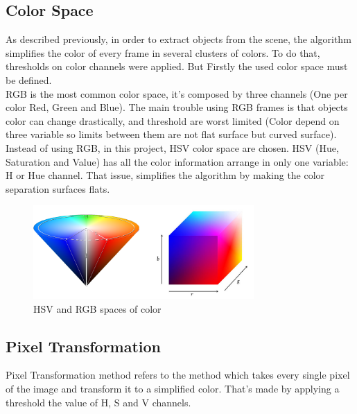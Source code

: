 \subsection{Color Space}
As described previously, in order to extract objects from the scene, the algorithm simplifies the color of every frame in several clusters of colors. To do that, thresholds on color channels were applied. But Firstly the used color space must be defined. \\
RGB is the most common color space, it's composed by three channels (One per color Red, Green and Blue). The main trouble using RGB frames is that objects color can change drastically, and threshold are worst limited (Color depend on three variable so limits between them are not flat surface but curved surface).
Instead of using RGB, in this project, HSV color space are chosen. HSV (Hue, Saturation and Value) has all the color information arrange in only one variable: H or Hue channel. That issue, simplifies the algorithm by making the color separation surfaces flats.  \\

\begin{figure}
	\centering
	\includegraphics[width=0.75\textwidth,natwidth=944,natheight=400]{../Images/c2/HSV_vs_RGB.png}
	\caption{HSV and RGB spaces of color}
	\label{fig:HSV_vs_RGB}
\end{figure}

\subsection{Pixel Transformation}
Pixel Transformation method refers to the method which takes every single pixel of the image and transform it to a simplified color. That's made by applying a threshold the value of H, S and V channels. \\

